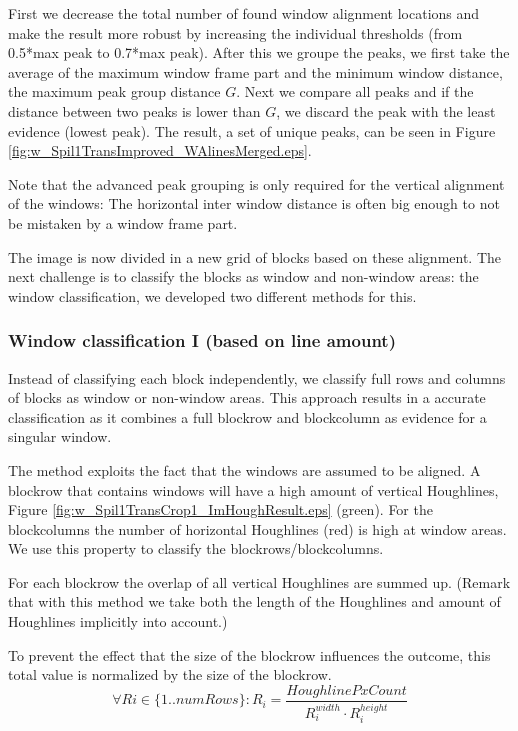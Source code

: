 First we decrease the total number of found window alignment locations and make 
the result more robust by increasing the individual thresholds (from 0.5*max
peak to 0.7*max peak). 
After this we groupe the peaks, we first take the average of the maximum window frame part and the minimum window
distance, the maximum peak group distance $G$.
Next we compare all peaks and if the distance between two peaks is lower than
$G$, we discard the peak with the least evidence (lowest peak). The result,
a set of unique peaks, can be seen in Figure \ref{fig:w_Spil1TransImproved_WAlinesMerged.eps}.

Note that the advanced peak grouping is only required for the vertical alignment
of the windows: The horizontal inter window distance is often big enough to not
be mistaken by a window frame part.

The image is now divided in a new grid of blocks based on these
alignment. The next challenge is to classify the blocks as window and
non-window areas: the window classification, we developed two different methods for this.


\subsubsection{Window classification I (based on line amount)}
Instead of classifying each block independently, we classify full rows and
columns of blocks as window or non-window areas.  This approach results in a accurate
classification as it combines a full blockrow and blockcolumn as evidence for a singular
window. 

The method exploits the fact that the windows are assumed to be
aligned.
A blockrow that contains windows will have a high amount of vertical
Houghlines, Figure \ref{fig:w_Spil1TransCrop1_ImHoughResult.eps}
(green). For the blockcolumns the number of horizontal Houghlines
 (red) is high at window areas.  We use this property to classify 
 the blockrows/blockcolumns. 

For each blockrow the overlap of all vertical Houghlines are summed up.
(Remark that with this method we take both the length of the Houghlines and
amount of Houghlines implicitly into account.)

To prevent the effect that the size of the blockrow influences the outcome, this total value
is normalized by the size of the blockrow.
\[\forall Ri\in \{1..numRows\} : R_i = \frac{HoughlinePxCount}{R_i^{width} \cdot R_i^{height}}\]

